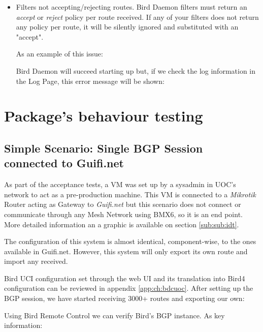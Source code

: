 \begin{itemize}
\item Filters not accepting/rejecting routes.
Bird Daemon filters must return an \textit{accept} or \textit{reject} policy per route received. If any of your filters does not return any policy per route, it will be silently ignored and substituted with an "accept".

As an example of this issue:


Bird Daemon will succeed starting up but, if we check the log information in the Log Page, this error message will be shown:


\end{itemize}


\section{Package's behaviour testing} 
\subsection{Simple Scenario: Single BGP Session connected to Guifi.net}
As part of the acceptance tests, a VM was set up by a sysadmin in UOC's network to act as a pre-production machine. This VM is connected to a \textit{Mikrotik} Router acting as Gateway to \textit{Guifi.net} but this scenario does not connect or communicate through any Mesh Network using BMX6, so it is an end point. More detailed information an a graphic is available on section \ref{sub:sub:idt}.

The configuration of this system is almost identical, component-wise, to the ones available in Guifi.net. However, this system will only export its own route and import any received.

Bird UCI configuration set through the web UI and its translation into Bird4 configuration can be reviewed in appendix \ref{app:ch:bdcuoc}. After setting up the BGP session, we have started receiving 3000+ routes and exporting our own:



Using Bird Remote Control we can verify Bird's BGP instance. As key information:

